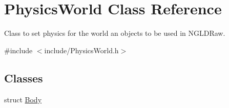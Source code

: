 \hypertarget{classPhysicsWorld}{
\section{PhysicsWorld Class Reference}
\label{classPhysicsWorld}
}


Class to set physics for the world an objects to be used in NGLDRaw.  


{\ttfamily \#include $<$include/PhysicsWorld.h$>$}\subsection*{Classes}
\begin{DoxyCompactItemize}
\item 
struct \hyperlink{structPhysicsWorld_1_1Body}{Body}
\end{DoxyCompactItemize}
